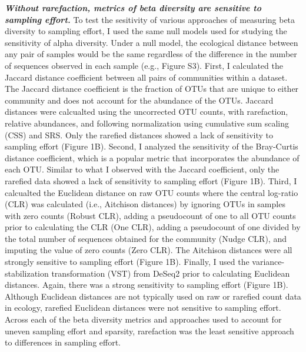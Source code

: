 \documentclass[
]{article}
\begin{document}
\textbf{\emph{Without rarefaction, metrics of beta diversity are
sensitive to sampling effort.}} To test the sesitivity of various
approaches of measuring beta diversity to sampling effort, I used the
same null models used for studying the sensitivity of alpha diversity.
Under a null model, the ecological distance between any pair of samples
would be the same regardless of the difference in the number of
sequences observed in each sample (e.g., Figure S3). First, I calculated
the Jaccard distance coefficient between all pairs of communities within
a dataset. The Jaccard distance coefficient is the fraction of OTUs that
are unique to either community and does not account for the abundance of
the OTUs. Jaccard distances were calcualted using the uncorrected OTU
counts, with rarefaction, relative abundances, and following
normalization using cumulative sum scaling (CSS) and SRS. Only the
rarefied distances showed a lack of sensitivity to sampling effort
(Figure 1B). Second, I analyzed the sensitivity of the Bray-Curtis
distance coefficient, which is a popular metric that incorporates the
abundance of each OTU. Similar to what I observed with the Jaccard
coefficient, only the rarefied data showed a lack of sensitivity to
sampling effort (Figure 1B). Third, I calcualted the Euclidean distance
on raw OTU counts where the central log-ratio (CLR) was calculated
(i.e., Aitchison distances) by ignoring OTUs in samples with zero counts
(Robust CLR), adding a pseudocount of one to all OTU counts prior to
calculating the CLR (One CLR), adding a pseudocount of one divided by
the total number of sequences obtained for the community (Nudge CLR),
and imputing the value of zero counts (Zero CLR). The Aitchison
distances were all strongly sensitive to sampling effort (Figure 1B).
Finally, I used the variance-stabilization transformation (VST) from
DeSeq2 prior to calculating Euclidean distances. Again, there was a
strong sensitivity to sampling effort (Figure 1B). Although Euclidean
distances are not typically used on raw or rarefied count data in
ecology, rarefied Euclidean distances were not sensitive to sampling
effort. Across each of the beta diversity metrics and approaches used to
account for uneven sampling effort and sparsity, rarefaction was the
least sensitive approach to differences in sampling effort.
\end{document}

